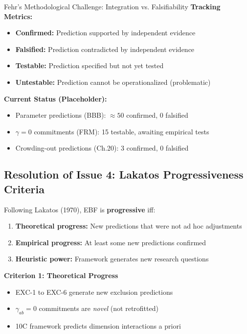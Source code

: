 \begin{chapter}{Fehr's Methodological Challenge: Integration vs. Falsifiability}
\textbf{Tracking Metrics:}
\begin{itemize}[noitemsep]
    \item \textbf{Confirmed:} Prediction supported by independent evidence
    \item \textbf{Falsified:} Prediction contradicted by independent evidence
    \item \textbf{Testable:} Prediction specified but not yet tested
    \item \textbf{Untestable:} Prediction cannot be operationalized (problematic)
\end{itemize}

\textbf{Current Status (Placeholder):}
\begin{itemize}[noitemsep]
    \item Parameter predictions (BBB): $\approx 50$ confirmed, 0 falsified
    \item $\gamma = 0$ commitments (FRM): 15 testable, awaiting empirical tests
    \item Crowding-out predictions (Ch.20): 3 confirmed, 0 falsified
\end{itemize}

\subsection{Resolution of Issue 4: Lakatos Progressiveness Criteria}
\label{sec:lakatos-criteria}

Following Lakatos (1970), EBF is \textbf{progressive} iff:
\begin{enumerate}[noitemsep]
    \item \textbf{Theoretical progress:} New predictions that were not ad hoc adjustments
    \item \textbf{Empirical progress:} At least some new predictions confirmed
    \item \textbf{Heuristic power:} Framework generates new research questions
\end{enumerate}

\begin{tcolorbox}[colback=green!5!white,colframe=green!75!black,title=\textbf{EBF Lakatos Assessment}]
\textbf{Criterion 1: Theoretical Progress}
\begin{itemize}[noitemsep]
    \item[$\checkmark$] EXC-1 to EXC-6 generate new exclusion predictions
    \item[$\checkmark$] $\gamma_{ab} = 0$ commitments are \textit{novel} (not retrofitted)
    \item[$\checkmark$] 10C framework predicts dimension interactions a priori
\end{itemize}


\end{tcolorbox}
\end{chapter}
